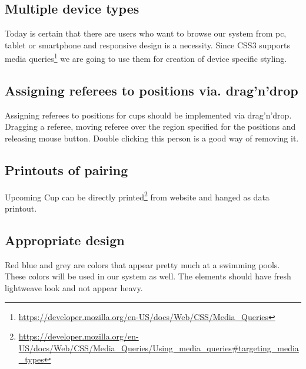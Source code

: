 \subsection*{Multiple device types}
\par
Today is certain that there are users who want to browse our system from pc, tablet or smartphone and responsive design is a necessity. Since CSS3 supports media queries\footnote{\url{https://developer.mozilla.org/en-US/docs/Web/CSS/Media_Queries}} we are going to use them for creation of device specific styling.
\subsection*{Assigning referees to positions via. drag'n'drop}
\par
Assigning referees to positions for cups should be implemented via drag'n'drop. Dragging a referee, moving referee over the region specified for the positions and releasing mouse button. Double clicking this person is a good way of removing it.
\subsection*{Printouts of pairing}
Upcoming Cup can be directly printed\footnote{\url{https://developer.mozilla.org/en-US/docs/Web/CSS/Media_Queries/Using_media_queries\#targeting_media_types}} from website and hanged as data printout. 
\subsection*{Appropriate design}
\par
Red blue and grey are colors that appear pretty much at a swimming pools. These colors will be used in our system as well. The elements should have fresh lightweave look and not appear heavy.

